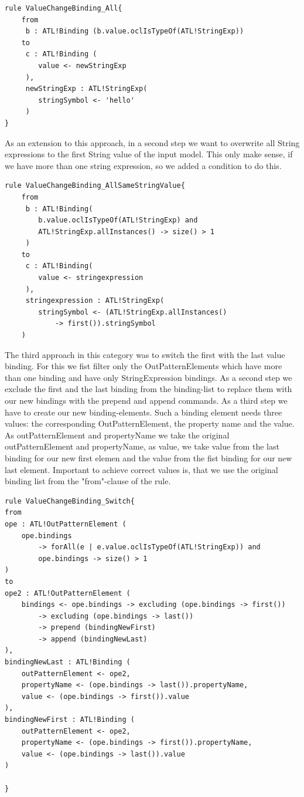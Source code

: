 \documentclass{llncs}
\begin{document}
\begin{lstlisting}
rule ValueChangeBinding_All{
	from
	 b : ATL!Binding (b.value.oclIsTypeOf(ATL!StringExp))
	to
	 c : ATL!Binding (
	 	value <- newStringExp
	 ),
	 newStringExp : ATL!StringExp(
	 	stringSymbol <- 'hello'	
	 )
}
\end{lstlisting}

As an extension to this approach, in a second step we want to overwrite all String expressions to the first String value of the input model. This only make sense, if we have more than one string expression, so we added a condition to do this.

\begin{lstlisting}
rule ValueChangeBinding_AllSameStringValue{
	from
	 b : ATL!Binding(
	 	b.value.oclIsTypeOf(ATL!StringExp) and 
		ATL!StringExp.allInstances() -> size() > 1
	 )
	to
	 c : ATL!Binding(
	 	value <- stringexpression
	 ), 
	 stringexpression : ATL!StringExp(
	 	stringSymbol <- (ATL!StringExp.allInstances() 
			-> first()).stringSymbol
	)
\end{lstlisting}

The third approach in this category was to switch the first with the last value binding. For this we fist filter only the OutPatternElements which have more than one binding and have only StringExpression bindings.
As a second step we exclude the first and the last binding from the binding-list to replace them with our new bindings with the prepend and append commands.
As a third step we have to create our new binding-elements.
Such a binding element needs three values: the corresponding OutPatternElement, the property name and the value.
As outPatternElement and propertyName we take the original outPatternElement and propertyName, as value, we take value from the last binding for our new first elemen and the value from the fist binding for our new last element.
Important to achieve correct values is, that we use the original binding list from the "from"-clause of the rule.

\begin{lstlisting}
rule ValueChangeBinding_Switch{
from
ope : ATL!OutPatternElement (
	ope.bindings 
		-> forAll(e | e.value.oclIsTypeOf(ATL!StringExp)) and
		ope.bindings -> size() > 1
)
to
ope2 : ATL!OutPatternElement (
	bindings <- ope.bindings -> excluding (ope.bindings -> first()) 
		-> excluding (ope.bindings -> last())
		-> prepend (bindingNewFirst)
		-> append (bindingNewLast)
), 
bindingNewLast : ATL!Binding (
	outPatternElement <- ope2, 
	propertyName <- (ope.bindings -> last()).propertyName,
	value <- (ope.bindings -> first()).value
),
bindingNewFirst : ATL!Binding (
	outPatternElement <- ope2,
	propertyName <- (ope.bindings -> first()).propertyName,
	value <- (ope.bindings -> last()).value	
)
	
}
\end{lstlisting}
\end{document}
